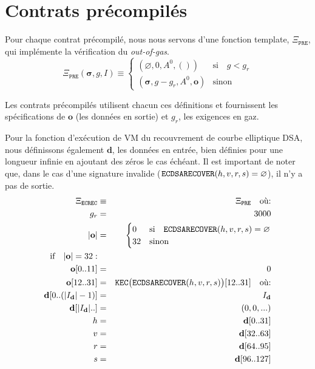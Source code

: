 \documentclass[9pt,oneside]{amsart}
\begin{document}
\section{Contrats précompilés}\label{app:precompiled}

Pour chaque contrat précompilé, nous nous servons d'une fonction template, $\Xi_{\mathtt{PRE}}$, qui implémente la vérification du \textit{out-of-gas}.
\begin{equation}
\Xi_{\mathtt{PRE}}(\boldsymbol{\sigma}, g, I) \equiv \begin{cases}
(\varnothing, 0, A^0, ()) & \text{si} \quad g < g_r \\
(\boldsymbol\sigma, g - g_r, A^0, \mathbf{o}) & \text{sinon}\end{cases}
\end{equation}

Les contrats précompilés utilisent chacun ces définitions et fournissent les spécifications de $\mathbf{o}$ (les données en sortie) et $g_r$, les exigences en gaz.

Pour la fonction d'exécution de VM du recouvrement de courbe elliptique DSA, nous définissons également $\mathbf{d}$, les données en entrée, bien définies pour une longueur infinie en ajoutant des zéros le cas échéant. Il est important de noter que, dans le cas d'une signature invalide ($\mathtt{\tiny ECDSARECOVER}(h, v, r, s) = \varnothing$), il n'y a pas de sortie.
\begin{eqnarray}
\Xi_{\mathtt{ECREC}} &\equiv& \Xi_{\mathtt{PRE}} \quad \text{où:} \\
g_r &=& 3000\\
|\mathbf{o}| &=& \begin{cases} 0 & \text{si} \quad \mathtt{\tiny ECDSARECOVER}(h, v, r, s) = \varnothing\\ 32 & \text{sinon} \end{cases}\\
\text{if} \quad |\mathbf{o}| = 32: &&\\
\mathbf{o}[0..11] &=& 0 \\
\mathbf{o}[12..31] &=& \mathtt{\tiny KEC}\big(\mathtt{\tiny ECDSARECOVER}(h, v, r, s)\big)[12..31] \quad \text{où:}\\
\mathbf{d}[0..(|I_\mathbf{d}|-1)] &=& I_\mathbf{d}\\
\mathbf{d}[|I_\mathbf{d}|..] &=& (0, 0, ...) \\
h &=& \mathbf{d}[0..31]\\
v &=& \mathbf{d}[32..63]\\
r &=& \mathbf{d}[64..95]\\
s &=& \mathbf{d}[96..127]
\end{eqnarray}
\end{document}
